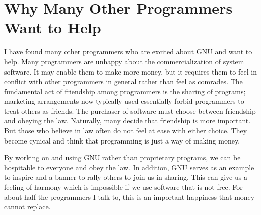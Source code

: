 \section{Why Many Other Programmers Want to Help}
I have found many other programmers who are excited about GNU and want to help.
Many programmers are unhappy about the commercialization of system software. It may enable them to make more money, but it requires them to feel in conflict with other programmers in general rather than feel as comrades. The fundamental act of friendship among programmers is the sharing of programs; marketing arrangements now typically used essentially forbid programmers to treat others as friends. The purchaser of software must choose between friendship and obeying the law. Naturally, many decide that friendship is more important. But those who believe in law often do not feel at ease with either choice. They become cynical and think that programming is just a way of making money.\par
By working on and using GNU rather than proprietary programs, we can be hospitable to everyone and obey the law. In addition, GNU serves as an example to inspire and a banner to rally others to join us in sharing. This can give us a feeling of harmony which is impossible if we use software that is not free. For about half the programmers I talk to, this is an important happiness that money cannot replace.
